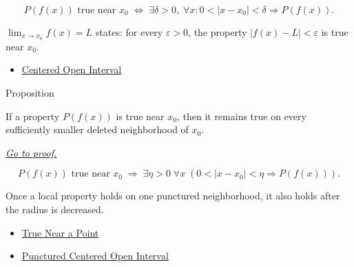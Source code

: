 \begin{remark*}
\[
  P(f(x))\text{ true near }x_0
  \;\iff\;
  \exists\delta>0,\;\forall x :
  0 < |x-x_0| < \delta \Rightarrow P(f(x)).
\]
\end{remark*}

\begin{remark*}[Interpretation]
$\lim_{x\to x_0}f(x)=L$ states: for every
$\varepsilon>0$, the property $|f(x)-L|<\varepsilon$ is true near $x_0$.
\end{remark*}

\begin{dependencies}
\begin{itemize}
  \item \hyperref[def:epsilon-neighbourhood]{Centered Open Interval}
\end{itemize}
\end{dependencies}

\begin{propositionbox}{Proposition}
\begin{proposition}
\label{prop:true-near-stable-under-shrinking}
If a property \(P(f(x))\) is true near \(x_0\), then it remains true on
every sufficiently smaller deleted neighborhood of \(x_0\).

\smallskip\noindent
\hyperref[prf:true-near-stable-under-shrinking]{\textit{Go to proof.}}
\end{proposition}
\end{propositionbox}

\begin{remark*}
\[
  P(f(x))\text{ true near }x_0
  \;\Longrightarrow\;
  \exists\eta>0\;\forall x\;(0<|x-x_0|<\eta\Rightarrow P(f(x))).
\]
\end{remark*}

\begin{remark*}[Interpretation]
Once a local property holds on one punctured neighborhood, it also holds after
the radius is decreased.
\end{remark*}

\begin{dependencies}
\begin{itemize}
  \item \hyperref[def:true-near]{True Near a Point}
  \item \hyperref[def:deleted-epsilon-neighbourhood]{Punctured Centered Open Interval}
\end{itemize}
\end{dependencies}

